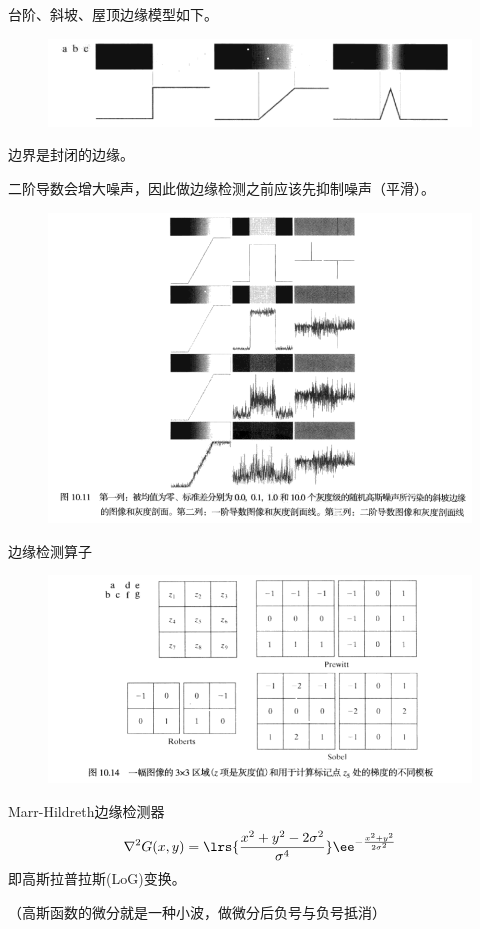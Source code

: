 台阶、斜坡、屋顶边缘模型如下。
\begin{figure}[H]
\centering
\includegraphics[width=0.9\linewidth]{fig/edge_model.png}
\end{figure}

边界是封闭的边缘。

二阶导数会增大噪声，因此做边缘检测之前应该先抑制噪声（平滑）。
\begin{figure}[H]
\centering
\includegraphics[width=0.9\linewidth]{fig/edge_detect_noise.png}
\end{figure}

边缘检测算子
\begin{figure}[H]
\centering
\includegraphics[width=0.9\linewidth]{fig/edge_detect_op.png}
\end{figure}

Marr-Hildreth边缘检测器
\[\nabla^2 G(x,y)=\lrs{\frac{x^2+y^2-2\sigma^2}{\sigma^4}}\ee^{-\frac{x^2+y^2}{2\sigma^2}}\]
即高斯拉普拉斯(LoG)变换。

（高斯函数的微分就是一种小波，做微分后负号与负号抵消）